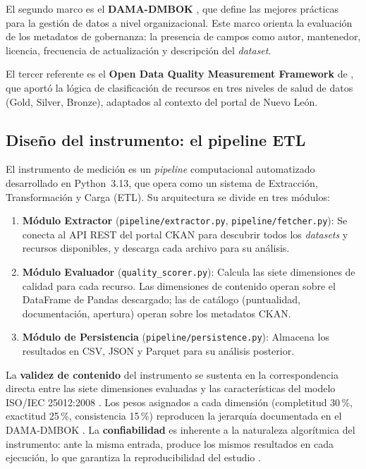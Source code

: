 \documentclass[12pt,letterpaper]{article}
\begin{document}
El segundo marco es el \textbf{DAMA-DMBOK} \parencite{dama2017}, que define las
mejores pr\'acticas para la gesti\'on de datos a nivel organizacional. Este marco orienta
la evaluaci\'on de los metadatos de gobernanza: la presencia de campos como autor,
mantenedor, licencia, frecuencia de actualizaci\'on y descripci\'on del \textit{dataset}.

El tercer referente es el \textbf{Open Data Quality Measurement Framework} de
\textcite{vetro2016}, que aport\'o la l\'ogica de clasificaci\'on de recursos en tres
niveles de salud de datos (Gold, Silver, Bronze), adaptados al contexto del portal de
Nuevo Le\'on.

\subsection{Dise\~no del instrumento: el pipeline ETL}

El instrumento de medici\'on es un \textit{pipeline} computacional automatizado
desarrollado en Python~3.13, que opera como un sistema de Extracci\'on, Transformaci\'on
y Carga (ETL). Su arquitectura se divide en tres m\'odulos:

\begin{enumerate}
  \item \textbf{M\'odulo Extractor} (\texttt{pipeline/extractor.py},
    \texttt{pipeline/fetcher.py}): Se conecta al API REST del portal CKAN para
    descubrir todos los \textit{datasets} y recursos disponibles, y descarga cada
    archivo para su an\'alisis.
  \item \textbf{M\'odulo Evaluador} (\texttt{quality\_scorer.py}): Calcula las siete
    dimensiones de calidad para cada recurso. Las dimensiones de contenido operan
    sobre el DataFrame de Pandas descargado; las de cat\'alogo (puntualidad,
    documentaci\'on, apertura) operan sobre los metadatos CKAN.
  \item \textbf{M\'odulo de Persistencia} (\texttt{pipeline/persistence.py}): Almacena
    los resultados en CSV, JSON y Parquet para su an\'alisis posterior.
\end{enumerate}

La \textbf{validez de contenido} del instrumento se sustenta en la
correspondencia directa entre las siete dimensiones evaluadas y las
caracter\'isticas del modelo ISO/IEC 25012:2008 \parencite{iso25012}. Los
pesos asignados a cada dimensi\'on (completitud 30\,\%, exactitud 25\,\%,
consistencia 15\,\%) reproducen la jerarqu\'ia documentada en el DAMA-DMBOK
\parencite{dama2017}. La \textbf{confiabilidad} es inherente a la naturaleza
algor\'itmica del instrumento: ante la misma entrada, produce los mismos
resultados en cada ejecuci\'on, lo que garantiza la reproducibilidad del
estudio \parencite{vizcaino2023}.
\end{document}
